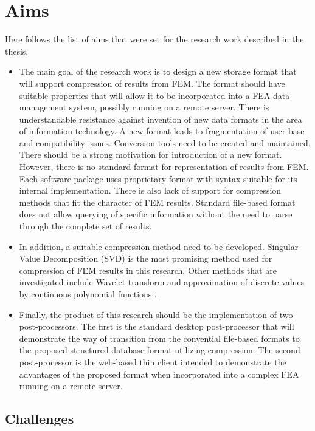 \chapter{Aims}
\label{chapter:aims}

Here follows the list of aims that were set for the research work described in the thesis.

\begin{itemize}
    \item The main goal of the research work is to design a new storage format that will support compression of results from FEM. The format should have suitable properties that will allow it to be incorporated into a FEA data management system, possibly running on a remote server. There is understandable resistance against invention of new data formats in the area of information technology. A new format leads to fragmentation of user base and compatibility issues. Conversion tools need to be created and maintained. There should be a strong motivation for introduction of a new format. However, there is no standard format for representation of results from FEM. Each software package uses proprietary format with syntax suitable for its internal implementation. There is also lack of support for compression methods that fit the character of FEM results. Standard file-based format does not allow querying of specific information without the need to parse through the complete set of results.
    \item In addition, a suitable compression method need to be developed. Singular Value Decomposition (SVD) is the most promising method used for compression of FEM results in this research. Other methods that are investigated include Wavelet transform \cite{Li2014} and approximation of discrete values by continuous polynomial functions \cite{Benes2016, Benes2016Pollack}.
    \item Finally, the product of this research should be the implementation of two post-processors. The first is the standard desktop post-processor that will demonstrate the way of transition from the convential file-based formats to the proposed structured database format utilizing compression. The second post-processor is the web-based thin client intended to demonstrate the advantages of the proposed format when incorporated into a complex FEA running on a remote server.
\end{itemize}

\section{Challenges}

